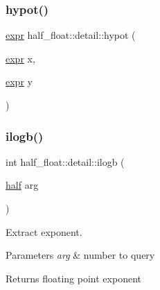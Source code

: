 \mbox{\label{namespacehalf__float_1_1detail_ad5632f31bdd1c66892231c5c4027ecd8}} 
\subsubsection{\texorpdfstring{hypot()}{hypot()}\hspace{0.1cm}{\footnotesize\ttfamily [4/4]}}
{\footnotesize\ttfamily \hyperlink{structhalf__float_1_1detail_1_1expr}{expr} half\+\_\+float\+::detail\+::hypot (\begin{DoxyParamCaption}\item[{\hyperlink{structhalf__float_1_1detail_1_1expr}{expr}}]{x,  }\item[{\hyperlink{structhalf__float_1_1detail_1_1expr}{expr}}]{y }\end{DoxyParamCaption})\hspace{0.3cm}{\ttfamily [inline]}}

\mbox{\label{namespacehalf__float_1_1detail_acd3e6c3b07beae2997cef825944411fe}} 
\subsubsection{\texorpdfstring{ilogb()}{ilogb()}\hspace{0.1cm}{\footnotesize\ttfamily [1/2]}}
{\footnotesize\ttfamily int half\+\_\+float\+::detail\+::ilogb (\begin{DoxyParamCaption}\item[{\hyperlink{classhalf__float_1_1half}{half}}]{arg }\end{DoxyParamCaption})\hspace{0.3cm}{\ttfamily [inline]}}

Extract exponent. 
\begin{DoxyParams}{Parameters}
{\em arg} & number to query \\
\hline
\end{DoxyParams}
\begin{DoxyReturn}{Returns}
floating point exponent 
\end{DoxyReturn}

